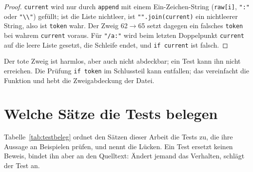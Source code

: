 \begin{proof}
	\texttt{current} wird nur durch \texttt{append} mit einem Ein-Zeichen-String (\texttt{raw[i]}, \texttt{":"} oder \texttt{"\textbackslash\textbackslash"}) gefüllt; ist die Liste nichtleer, ist \texttt{"".join(current)} ein nichtleerer String, also ist \texttt{token} wahr. Der Zweig 62$\to$65 setzt dagegen ein falsches \texttt{token} bei wahrem \texttt{current} voraus. Für \texttt{"/a:"} wird beim letzten Doppelpunkt \texttt{current} auf die leere Liste gesetzt, die Schleife endet, und \texttt{if current} ist falsch.
\end{proof}

Der tote Zweig ist harmlos, aber auch nicht abdeckbar; ein Test kann ihn nicht erreichen. Die Prüfung \texttt{if token} im Schlussteil kann entfallen; das vereinfacht die Funktion und hebt die Zweigabdeckung der Datei.

\section{Welche Sätze die Tests belegen}

Tabelle~\ref{tab:testbeleg} ordnet den Sätzen dieser Arbeit die Tests zu, die ihre Aussage an Beispielen prüfen, und nennt die Lücken. Ein Test ersetzt keinen Beweis, bindet ihn aber an den Quelltext: Ändert jemand das Verhalten, schlägt der Test an.

